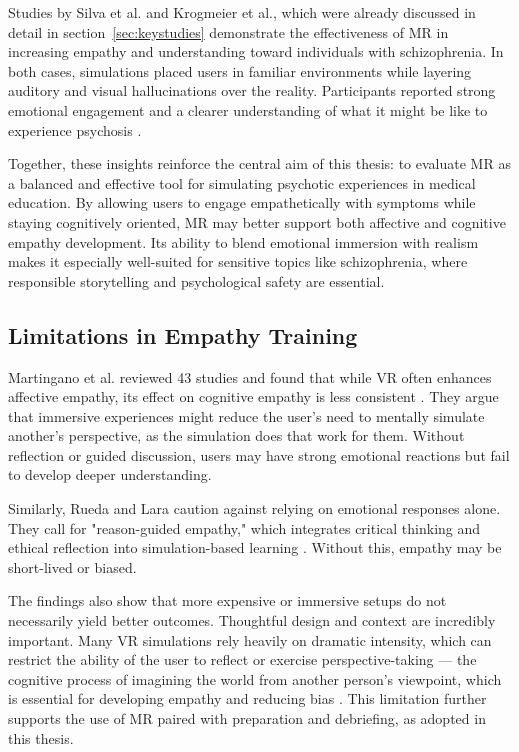 Studies by Silva et al. and Krogmeier et al., which were already discussed in detail in section~\ref{sec:keystudies} demonstrate the effectiveness of MR in increasing empathy and understanding toward individuals with schizophrenia. In both cases, simulations placed users in familiar environments while layering auditory and visual hallucinations over the reality. Participants reported strong emotional engagement and a clearer understanding of what it might be like to experience psychosis \cite{Silva2017, Krogmeier2024}. 

Together, these insights reinforce the central aim of this thesis: to evaluate MR as a balanced and effective tool for simulating psychotic experiences in medical education. By allowing users to engage empathetically with symptoms while staying cognitively oriented, MR may better support both affective and cognitive empathy development. Its ability to blend emotional immersion with realism makes it especially well-suited for sensitive topics like schizophrenia, where responsible storytelling and psychological safety are essential.


\subsection{Limitations in Empathy Training}

Martingano et al. reviewed 43 studies and found that while VR often enhances affective empathy, its effect on cognitive empathy is less consistent \cite{Martingano2021}. They argue that immersive experiences might reduce the user's need to mentally simulate another's perspective, as the simulation does that work for them. Without reflection or guided discussion, users may have strong emotional reactions but fail to develop deeper understanding.

Similarly, Rueda and Lara caution against relying on emotional responses alone. They call for "reason-guided empathy," which integrates critical thinking and ethical reflection into simulation-based learning \cite{Rueda2020}. Without this, empathy may be short-lived or biased.

The findings also show that more expensive or immersive setups do not necessarily yield better outcomes. Thoughtful design and context are incredibly important. Many VR simulations rely heavily on dramatic intensity, which can restrict the ability of the user to reflect or exercise perspective-taking — the cognitive process of imagining the world from another person’s viewpoint, which is essential for developing empathy and reducing bias \cite{Mattsson2024}. This limitation further supports the use of MR paired with preparation and debriefing, as adopted in this thesis.

